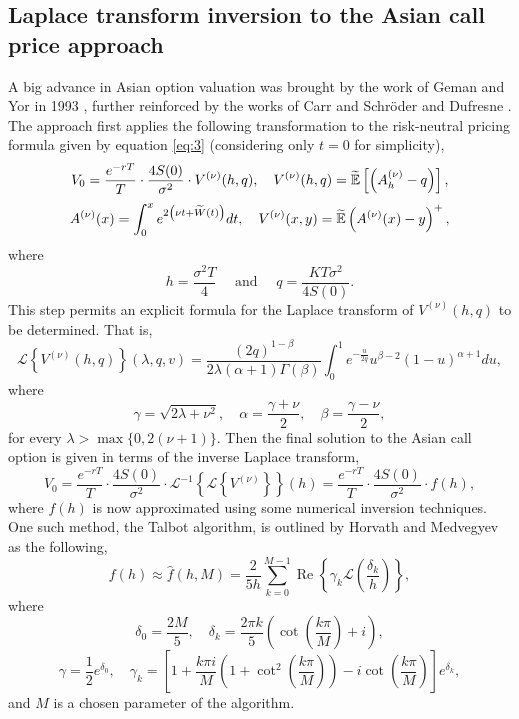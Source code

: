 
\label{Valuation Approaches}

\subsection{Laplace transform inversion to the Asian call price approach}

A big advance in Asian option valuation was brought by the work of Geman and Yor in 1993 \cite{geman}, further reinforced by the works of Carr and Schröder \cite{carr} and Dufresne \cite{dufresne}.
The approach first applies the following transformation to the risk-neutral pricing formula given by equation \eqref{eq:3} (considering only \(t= 0\) for simplicity),
$$V_0=\frac{e^{-rT}}{T} \cdot \frac{4 S(0)}{\sigma^2} \cdot V^{(\nu)}(h, q), \quad V^{(\nu)}(h, q)=\widetilde{\mathbb{E}}\left[\left(A_h^{(\nu)}-q\right)\right],$$
\[
A^{(\nu)}(x) = \int_0^x e^{2\left(\nu t+\widetilde{W}(t)\right)}  dt, \quad
V^{(\nu)}(x, y) = \widetilde{\mathbb{E}}\left(A^{(\nu)}(x)-y\right)^{+},
\]
where 
$$h = \frac{\sigma^2 T}{4} \quad \text { and } \quad q = \frac{K T \sigma^2}{4 S(0)}.$$
This step permits an explicit formula for the Laplace transform of \(V^{(\nu)}(h, q)\) to be determined. That is, 
$$
\mathcal{L}\left\{V^{(\nu)}(h, q)\right\}(\lambda, q, v)=\frac{(2 q)^{1-\beta}}{2 \lambda(\alpha+1) \Gamma(\beta)} \int_0^1 e^{-\frac{u}{2 q}} u^{\beta-2}(1-u)^{\alpha+1} du,
$$
where
\[
\gamma = \sqrt{2 \lambda+\nu^2}, \quad \alpha = \frac{\gamma+\nu}{2}, \quad \beta = \frac{\gamma-\nu}{2},
\]
for every \(\lambda>\max \{0,2(\nu+1)\}\).
Then the final solution to the Asian call option is given in terms of the inverse Laplace transform,
$$V_0=\frac{e^{-rT}}{T} \cdot \frac{4 S(0)}{\sigma^2} \cdot \mathcal{L}^{-1} \left\{\mathcal{L}\left\{V^{(\nu)}\right\}\right\} (h) = \frac{e^{-rT}}{T} \cdot \frac{4 S(0)}{\sigma^2} \cdot f(h),$$
where \(f(h)\) is now approximated using some numerical inversion techniques.
One such method, the Talbot algorithm, is outlined by Horvath and Medvegyev \cite{nummethods} as the following,
$$f(h) \approx \hat{f}(h, M) = \frac{2}{5 h} \sum_{k=0}^{M-1} \operatorname{Re}\left\{\gamma_k \mathcal{L}\left(\frac{\delta_k}{h}\right)\right\},$$
where
$$\delta_0 = \frac{2 M}{5}, \quad \delta_k = \frac{2 \pi k}{5}\left(\cot \left(\frac{k\pi}{M}\right)+i\right),$$
$$\gamma = \frac{1}{2} e^{\delta_0}, \quad \gamma_k = \left[1+\frac{k\pi i}{M}\left(1+\cot ^2\left(\frac{k\pi}{M}\right)\right)-i \cot \left(\frac{k\pi}{M}\right)\right] e^{\delta_k}, $$
and \(M\) is a chosen parameter of the algorithm.

